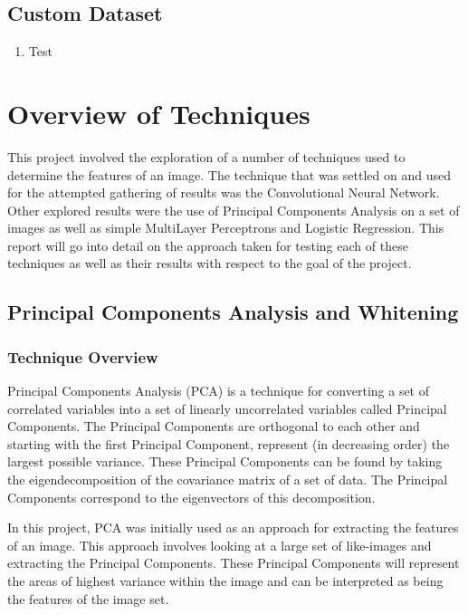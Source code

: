 \documentclass{article}
\begin{document}
\subsection{Custom Dataset}

\begin{enumerate}
  \item Test
\end{enumerate}

\section{Overview of Techniques}

This project involved the exploration of a number of techniques used to determine the features of an image. The technique that was settled
on and used for the attempted gathering of results was the Convolutional Neural Network. Other explored results were the use of Principal
Components Analysis on a set of images as well as simple MultiLayer Perceptrons and Logistic Regression. This report will go into detail on
the approach taken for testing each of these techniques as well as their results with respect to the goal of the project.

\subsection{Principal Components Analysis and Whitening}
  \subsubsection{Technique Overview}
  
  Principal Components Analysis (PCA) is a technique for converting a set of correlated variables into a set of linearly uncorrelated variables
  called Principal Components. The Principal Components are orthogonal to each other and starting with the first Principal Component, represent
  (in decreasing order) the largest possible variance. These Principal Components can be found by taking the eigendecomposition of the covariance
  matrix of a set of data. The Principal Components correspond to the eigenvectors of this decomposition.

  In this project, PCA was initially used as an approach for extracting the features of an image. This approach involves looking at a large set of
  like-images and extracting the Principal Components. These Principal Components will represent the areas of highest variance within the image and
  can be interpreted as being the features of the image set.
  
\end{document}
